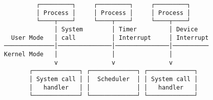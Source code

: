 \documentclass[varwidth=50em,crop]{standalone}
\begin{document}
\begin{verbatim}
         ┌─────────┐     ┌─────────┐     ┌─────────┐
         │ Process │     │ Process │     │ Process │
         └────┬────┘     └────┬────┘     └────┬────┘
              │ System        │ Timer         │ Device
  User Mode   │ call          │ Interrupt     │ Interrupt 
──────────────│───────────────│───────────────│──────────
Kernel Mode   │               │               │ 
              v               v               v
       ┌─────────────┐ ┌─────────────┐ ┌─────────────┐
       │ System call │ │  Scheduler  │ │ System call │
       │   handler   │ │             │ │   handler   │
       └─────────────┘ └─────────────┘ └─────────────┘
\end{verbatim}
\end{document}

